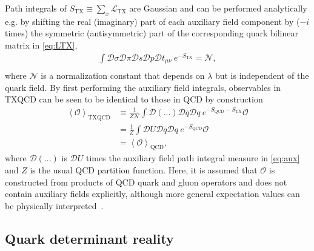 \documentclass[%
    twocolumn,
superscriptaddress,
preprintnumbers,
nofootinbib,
 amsmath,amssymb,
 aps,
 prd,
 floatfix,
]{revtex4-2}
\newcommand{\tx}[0]{\text{TX}}
\newcommand{\qcd}[0]{\text{QCD}}
\newcommand{\txqcd}[0]{\text{TXQCD}}
\begin{document}
Path integrals of $S_{\tx} \equiv \sum_x \mathcal{L}_{\tx}$ are Gaussian and can be performed analytically e.g. by shifting the real (imaginary) part of each auxiliary field component by ($-i$ times) the symmetric (antisymmetric) part of the corresponding quark bilinear matrix in \cref{eq:LTX},
\begin{equation}\label{eq:aux}
\begin{split}
    \int \mathcal{D}\sigma\mathcal{D}\pi\mathcal{D}s\mathcal{D}p\mathcal{D}t_{\mu\nu} \ e^{-S_{\tx}} = \mathcal{N}, \\
    \end{split}
\end{equation}
where $\mathcal{N}$ is a normalization constant that depends on $\lambda$ but is independent of the quark field.
By first performing the auxiliary field integrals, observables in TXQCD can be seen to be identical to those in QCD by construction
\begin{equation}
\begin{split}
\left< \mathcal{O} \right>_{\txqcd} &\equiv \frac{1}{Z \mathcal{N}} \int \mathcal{D}(...)\mathcal{D}\overline{q} \mathcal{D}q\ e^{-S_{\qcd} - S_{\tx}} \mathcal{O} \\
&= \frac{1}{Z} \int \mathcal{D}U \mathcal{D}\overline{q} \mathcal{D}q\ e^{-S_{\qcd}} \mathcal{O} \\
&= \left< \mathcal{O} \right>_{\qcd},
\end{split}
\end{equation}
where $\mathcal{D}(...)$ is $\mathcal{D}U$ times the auxiliary field path integral measure in \cref{eq:aux} and $Z$ is the usual QCD partition function.
Here, it is assumed that $\mathcal{O}$ is constructed from products of QCD quark and gluon operators and does not contain auxiliary fields explicitly, although more general expectation values can be physically interpreted~\cite{Kaplan:2013dca}.


\subsection{Quark determinant reality}
\end{document}
